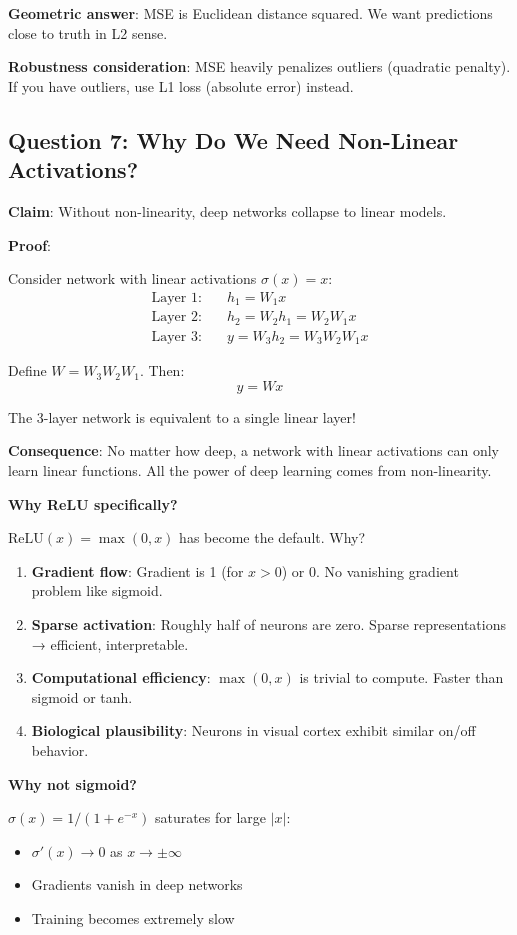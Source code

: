 \textbf{Geometric answer}: MSE is Euclidean distance squared. We want predictions close to truth in L2 sense.

\textbf{Robustness consideration}: MSE heavily penalizes outliers (quadratic penalty). If you have outliers, use L1 loss (absolute error) instead.

\subsection{Question 7: Why Do We Need Non-Linear Activations?}

\textbf{Claim}: Without non-linearity, deep networks collapse to linear models.

\textbf{Proof}:

Consider network with linear activations $\sigma(x) = x$:
\begin{align*}
\text{Layer 1:} \quad & h_1 = W_1 x \\
\text{Layer 2:} \quad & h_2 = W_2 h_1 = W_2 W_1 x \\
\text{Layer 3:} \quad & y = W_3 h_2 = W_3 W_2 W_1 x
\end{align*}

Define $W = W_3 W_2 W_1$. Then:
\[
y = W x
\]

The 3-layer network is equivalent to a single linear layer!

\textbf{Consequence}: No matter how deep, a network with linear activations can only learn linear functions. All the power of deep learning comes from non-linearity.

\textbf{Why ReLU specifically?}

$\text{ReLU}(x) = \max(0, x)$ has become the default. Why?

\begin{enumerate}
\item \textbf{Gradient flow}: Gradient is 1 (for $x > 0$) or 0. No vanishing gradient problem like sigmoid.
\item \textbf{Sparse activation}: Roughly half of neurons are zero. Sparse representations → efficient, interpretable.
\item \textbf{Computational efficiency}: $\max(0,x)$ is trivial to compute. Faster than sigmoid or tanh.
\item \textbf{Biological plausibility}: Neurons in visual cortex exhibit similar on/off behavior.
\end{enumerate}

\textbf{Why not sigmoid?}

$\sigma(x) = 1/(1 + e^{-x})$ saturates for large $|x|$:
\begin{itemize}
\item $\sigma'(x) \to 0$ as $x \to \pm\infty$
\item Gradients vanish in deep networks
\item Training becomes extremely slow
\end{itemize}

